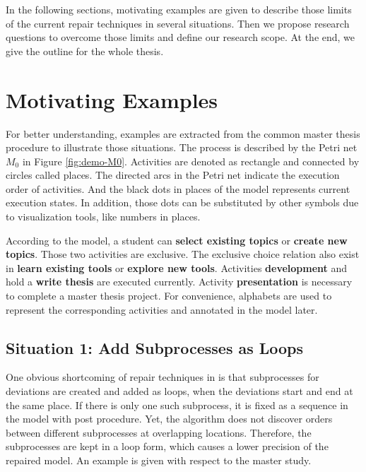 In the following sections, motivating examples are given to describe those limits of the current repair techniques in several situations. Then we propose research questions to overcome those limits and define our research scope. At the end, we give the outline for the whole thesis.
\section{Motivating Examples}

For better understanding, examples are extracted from the common master thesis procedure to illustrate those situations. The process is described by the Petri net $M_0$ in Figure \ref{fig:demo-M0}. Activities are denoted as rectangle and connected by circles called places. The directed arcs in the Petri net indicate the execution order of activities. And the black dots in places of the model represents current execution states. In addition, those dots can be substituted by other symbols due to visualization tools, like numbers in places.

According to the model, a student can \textbf{select existing topics}  or \textbf{create new topics}. Those two activities are exclusive. The exclusive choice relation also exist in  \textbf{learn existing tools}  or \textbf{explore new tools}. Activities \textbf{development} and hold a \textbf{write thesis} are executed currently. Activity \textbf{presentation} is necessary to complete a master thesis project. For convenience, alphabets are used to represent the corresponding activities and annotated in the model later.

\subsection{Situation 1: \small{Add Subprocesses as Loops}} %
One obvious shortcoming of repair techniques in \cite{fahland2015model} is that subprocesses for  deviations are created and added as loops, when the deviations start and end at the same place. If there is only one such subprocess, it is fixed as a sequence in the model with post procedure. Yet, the algorithm does not discover orders between different subprocesses at overlapping locations. Therefore, the subprocesses are kept in a loop form, which causes a lower precision of the repaired model. An example is given with respect to the master study. 


